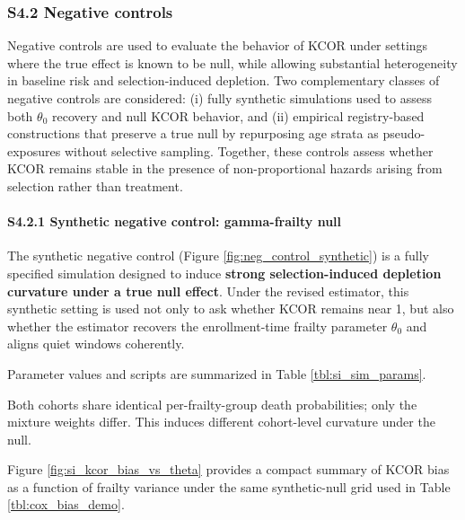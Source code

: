 \documentclass[
]{article}
\begin{document}
\subsubsection{S4.2 Negative controls}\label{s4.2-negative-controls}

Negative controls are used to evaluate the behavior of KCOR under
settings where the true effect is known to be null, while allowing
substantial heterogeneity in baseline risk and selection-induced
depletion. Two complementary classes of negative controls are
considered: (i) fully synthetic simulations used to assess both
\(\theta_0\) recovery and null KCOR behavior, and (ii) empirical
registry-based constructions that preserve a true null by repurposing
age strata as pseudo-exposures without selective sampling. Together,
these controls assess whether KCOR remains stable in the presence of
non-proportional hazards arising from selection rather than treatment.

\paragraph{S4.2.1 Synthetic negative control: gamma-frailty
null}\label{s4.2.1-synthetic-negative-control-gamma-frailty-null}

The synthetic negative control (Figure \ref{fig:neg_control_synthetic})
is a fully specified simulation designed to induce \textbf{strong
selection-induced depletion curvature under a true null effect}. Under
the revised estimator, this synthetic setting is used not only to ask
whether KCOR remains near 1, but also whether the estimator recovers the
enrollment-time frailty parameter \(\theta_0\) and aligns quiet windows
coherently.

Parameter values and scripts are summarized in Table
\ref{tbl:si_sim_params}.

Both cohorts share identical per-frailty-group death probabilities; only
the mixture weights differ. This induces different cohort-level
curvature under the null.

Figure \ref{fig:si_kcor_bias_vs_theta} provides a compact summary of
KCOR bias as a function of frailty variance under the same
synthetic-null grid used in Table \ref{tbl:cox_bias_demo}.
\end{document}
